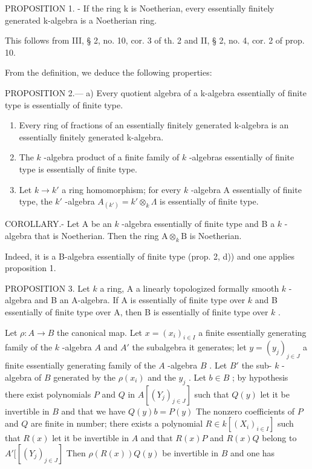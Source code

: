 PROPOSITION 1. - If the ring k is Noetherian, every essentially finitely generated k-algebra is a Noetherian ring.

This follows from III, § 2, no. 10, cor. 3 of th. 2 and II, § 2, no. 4, cor. 2 of prop. 10.

From the definition, we deduce the following properties:

PROPOSITION 2.--- a) Every quotient algebra of a k-algebra essentially of finite type is essentially of finite type.

\begin{enumerate}
\def\labelenumi{\alph{enumi})}
\setcounter{enumi}{1}
\item
  Every ring of fractions of an essentially finitely generated k-algebra is an essentially finitely generated k-algebra.
\item
  The \(k\) -algebra product of a finite family of \(k\) -algebras essentially of finite type is essentially of finite type.
\item
  Let \(k \to k'\) a ring homomorphism; for every \(k\) -algebra A essentially of finite type, the \(k'\) -algebra \(A_{(k')} = k' \otimes_k \Lambda\) is essentially of finite type.
\end{enumerate}

COROLLARY.- Let A be an \(k\) -algebra essentially of finite type and B a \(k\) -algebra that is Noetherian. Then the ring \(\mathrm{A} \otimes_k \mathrm{B}\) is Noetherian.

Indeed, it is a B-algebra essentially of finite type (prop. 2, d)) and one applies proposition 1.

PROPOSITION 3. Let \(k\) a ring, A a linearly topologized formally smooth \(k\) -algebra and B an A-algebra. If A is essentially of finite type over \(k\) and B essentially of finite type over A, then B is essentially of finite type over \(k\) .

Let \(\rho: A \to B\) the canonical map. Let \(x = (x_i)_{i \in I}\) a finite essentially generating family of the \(k\) -algebra \(A\) and \(A'\) the subalgebra it generates; let \(y = (y_j)_{j \in J}\) a finite essentially generating family of the \(A\) -algebra \(B\) . Let \(B'\) the sub- \(k\) -algebra of \(B\) generated by the \(\rho(x_i)\) and the \(y_j\) . Let \(b \in B\) ; by hypothesis there exist polynomials \(P\) and \(Q\) in \(A[(Y_j)_{j \in J}]\) such that \(Q(y)\) let it be invertible in \(B\) and that we have \(Q(y)b = P(y)\) The nonzero coefficients of \(P\) and \(Q\) are finite in number; there exists a polynomial \(R \in k[(X_i)_{i \in I}]\) such that \(R(x)\) let it be invertible in \(A\) and that \(R(x)P\) and \(R(x)Q\) belong to \(A'[[(Y_j)_{j \in J}]\) Then \(\rho(R(x))Q(y)\) be invertible in \(B\) and one has

